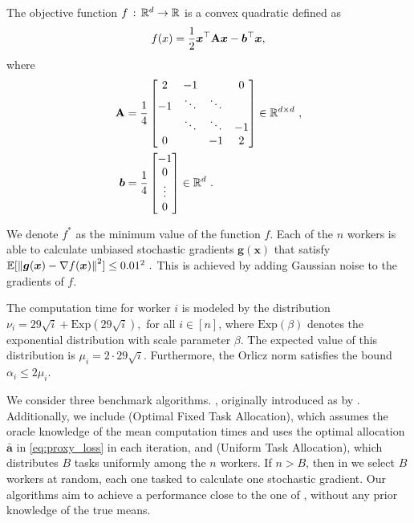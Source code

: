 The objective function $f \,:\, \mathbb{R}^d \to \mathbb{R}$ is a convex quadratic defined as
$$
    f(x) = \frac{1}{2} \bm{x}^\top \mathbf{A} \bm{x} - \bm{b}^\top \bm{x},
$$
where
\begin{align*}
    \mathbf{A} &= \frac{1}{4}
    \begin{bmatrix}
    2 & -1 &  & 0 \\
    -1 & \ddots & \ddots &  \\
    & \ddots & \ddots & -1 \\
    0 & & -1 & 2 \\
    \end{bmatrix}
    \in \mathbb{R}^{d \times d} ~, \\
    \bm{b} &= \frac{1}{4}
    \begin{bmatrix}
    -1 \\
    0 \\
    \vdots \\
    0 \\
    \end{bmatrix}
    \in \mathbb{R}^d~.
\end{align*}

We denote $f^*$ as the minimum value of the function $f$.
Each of the $n$ workers is able to calculate unbiased stochastic gradients $\bm{g}(\bm{x})$ that satisfy
$
    \mathbb{E}[\left\| \bm{g}(\bm{x}) - \nabla f(\bm{x}) \right\|^2] \le 0.01^2~.
$
This is achieved by adding Gaussian noise to the gradients of $f$.

The computation time for worker $i$ is modeled by the distribution
$
    \nu_i = 29\sqrt{i} + \mathrm{Exp}(29\sqrt{i}),
$
for all $i \in [n]$, where $\mathrm{Exp}(\beta)$ denotes the exponential distribution with scale parameter $\beta$. The expected value of this distribution is $\mu_i = 2 \cdot 29 \sqrt{i}$.
Furthermore, the Orlicz norm satisfies the bound $\alpha_i \le 2\mu_i$.

We consider three benchmark algorithms.
, originally introduced as  by \citet{tyurin2024optimal}.
Additionally, we include  ({\red O}ptimal {\red F}ixed {\red T}ask {\red A}llocation), which assumes the oracle knowledge of the mean computation times and uses the optimal allocation $\bar{\bm{a}}$ in \eqref{eq:proxy_loss} in each iteration, and  ({\red U}niform {\red T}ask {\red A}llocation), which distributes $B$ tasks uniformly among the $n$ workers. If $n>B$, then in  we select $B$ workers at random, each one tasked to calculate one stochastic gradient.
Our algorithms aim to achieve a performance close to the one of , without any prior knowledge of the true means.

